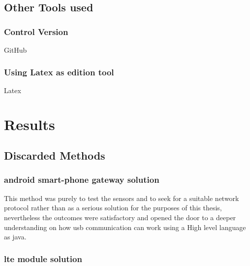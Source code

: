 \documentclass[hidelinks,11pt,a4paper,oneside,article]{memoir}
\begin{document}
\section{Other Tools used}
\subsection{Control Version}
GitHub
\subsection{Using Latex as edition tool}
Latex

\chapter{Results}

\section{Discarded Methods}
\subsection{android smart-phone gateway solution}
This method was purely to test the sensors and to seek for a suitable network protocol rather than as a serious solution for the purposes of this thesis, nevertheless the outcomes were satisfactory and opened the door to a deeper understanding on how \gls{usb} communication can work using a High level language as \gls{java}.
\subsection{\gls{lte} module solution}
\end{document}
